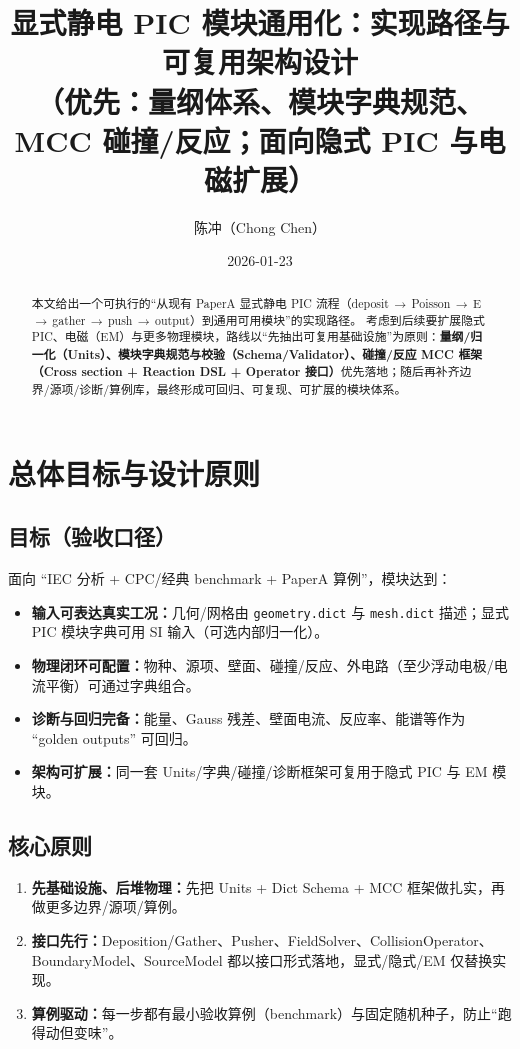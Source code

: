 \documentclass[11pt,a4paper]{ctexart}
\title{显式静电 PIC 模块通用化：实现路径与可复用架构设计\\\large（优先：量纲体系、模块字典规范、MCC 碰撞/反应；面向隐式 PIC 与电磁扩展）}
\author{陈冲（Chong Chen）}
\date{2026-01-23}
\begin{document}
\maketitle

\begin{abstract}
本文给出一个可执行的“从现有 PaperA 显式静电 PIC 流程（deposit\,$\rightarrow$\,Poisson\,$\rightarrow$\,E\,$\rightarrow$\,gather\,$\rightarrow$\,push\,$\rightarrow$\,output）到通用可用模块”的实现路径。
考虑到后续要扩展隐式 PIC、电磁（EM）与更多物理模块，路线以“先抽出可复用基础设施”为原则：\textbf{量纲/归一化（Units）、模块字典规范与校验（Schema/Validator）、碰撞/反应 MCC 框架（Cross section + Reaction DSL + Operator 接口）}优先落地；随后再补齐边界/源项/诊断/算例库，最终形成可回归、可复现、可扩展的模块体系。
\end{abstract}

\tableofcontents

\section{总体目标与设计原则}
\subsection{目标（验收口径）}
面向 “IEC 分析 + CPC/经典 benchmark + PaperA 算例”，模块达到：
\begin{itemize}[leftmargin=2em]
\item \textbf{输入可表达真实工况：}几何/网格由 \texttt{geometry.dict} 与 \texttt{mesh.dict} 描述；显式 PIC 模块字典可用 SI 输入（可选内部归一化）。
\item \textbf{物理闭环可配置：}物种、源项、壁面、碰撞/反应、外电路（至少浮动电极/电流平衡）可通过字典组合。
\item \textbf{诊断与回归完备：}能量、Gauss 残差、壁面电流、反应率、能谱等作为 ``golden outputs'' 可回归。
\item \textbf{架构可扩展：}同一套 Units/字典/碰撞/诊断框架可复用于隐式 PIC 与 EM 模块。
\end{itemize}

\subsection{核心原则}
\begin{enumerate}[leftmargin=2em]
\item \textbf{先基础设施、后堆物理：}先把 Units + Dict Schema + MCC 框架做扎实，再做更多边界/源项/算例。
\item \textbf{接口先行：}Deposition/Gather、Pusher、FieldSolver、CollisionOperator、BoundaryModel、SourceModel 都以接口形式落地，显式/隐式/EM 仅替换实现。
\item \textbf{算例驱动：}每一步都有最小验收算例（benchmark）与固定随机种子，防止“跑得动但变味”。
\end{enumerate}
\end{document}
